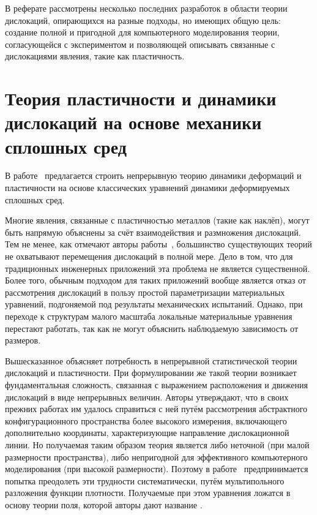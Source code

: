 \documentclass[a4paper, 14pt, titlepage]{extarticle}
\begin{document}
  В реферате рассмотрены несколько последних разработок в области теории дислокаций,
  опирающихся на разные подходы, но имеющих общую цель: создание полной и пригодной для
  компьютерного моделирования теории, согласующейся с экспериментом и позволяющей описывать
  связанные с дислокациями явления, такие как пластичность.

  \section{Теория пластичности и динамики дислокаций на основе механики сплошных сред}

  В работе~\cite{hochrainer-cdd} предлагается строить непрерывную теорию динамики деформаций и
  пластичности на основе классических уравнений динамики деформируемых сплошных сред.

  Многие явления, связанные с пластичностью металлов (такие как наклёп), могут быть напрямую
  объяснены за счёт взаимодействия и размножения дислокаций. Тем не менее, как отмечают авторы
  работы~\cite{hochrainer-cdd}, большинство существующих теорий не охватывают перемещения дислокаций в полной мере.
  Дело в том, что для традиционных инженерных приложений эта проблема не является существенной.
  Более того, обычным подходом для таких приложений вообще является отказ от рассмотрения дислокаций
  в пользу простой параметризации материальных уравнений, подгоняемой под результаты механических
  испытаний. Однако, при переходе к структурам малого масштаба локальные материальные уравнения
  перестают работать, так как не могут объяснить наблюдаемую зависимость от размеров.

  Вышесказанное объясняет потребность в непрерывной статистической теории дислокаций и пластичности. При
  формулировании же такой теории возникает фундаментальная сложность, связанная с выражением
  расположения и движения дислокаций в виде непрерывных величин. Авторы утверждают, что в своих
  прежних работах им удалось справиться с ней путём рассмотрения абстрактного
  конфигурационного пространства более высокого измерения, включающего дополнительно координаты,
  характеризующие направление дислокационной линии. Но получаемая таким образом теория является либо
  неточной (при малой размерности пространства), либо непригодной для эффективного компьютерного
  моделирования (при высокой размерности). Поэтому в работе~\cite{hochrainer-cdd} предпринимается попытка
  преодолеть эти трудности систематически, путём мультипольного разложения функции плотности.
  Получаемые при этом уравнения ложатся в основу теории поля, которой авторы дают название
  .
\end{document}
